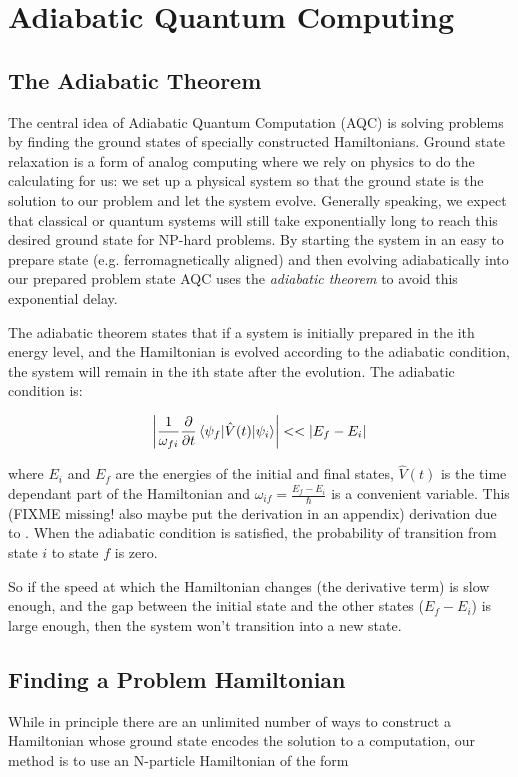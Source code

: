 \chapter{Adiabatic Quantum Computing}
\label{chap:aqc}

\section{The Adiabatic Theorem}

The central idea of Adiabatic Quantum Computation (AQC) is solving problems by finding the ground states of specially constructed Hamiltonians.  Ground state relaxation is a form of analog computing where we rely on physics to do the calculating for us: we set up a physical system so that the ground state is the solution to our problem and let the system evolve.  Generally speaking, we expect that classical or quantum systems will still take exponentially long to reach this desired ground state for NP-hard problems.\cite{aaronson}
By starting the system in an easy to prepare state (e.g. ferromagnetically aligned) and then evolving adiabatically into our prepared problem state AQC uses the \emph{adiabatic theorem} to avoid this exponential delay.

The adiabatic theorem states that if a system is initially prepared in the ith energy level, and the Hamiltonian is evolved according to the adiabatic condition, the system will remain in the ith state after the evolution.  The adiabatic condition is:

\begin{displaymath}
	\left | \frac{1}{\omega_{fi}}\frac{\partial}{\partial t} \mathinner{\langle{\psi_f | \hat{V}(t) | \psi_i}\rangle} \right | << |E_f - E_i|
\end{displaymath}

where $E_i$ and $E_f$ are the energies of the initial and final states, $\hat{V}(t)$ is the time dependant part of the Hamiltonian and $\omega_{if} = \frac{E_f - E_i}{\hbar}$ is a convenient variable.  This (FIXME missing! also maybe put the derivation in an appendix) derivation due to \cite{zettili}.  When the adiabatic condition is satisfied, the probability of transition from state $i$ to state $f$ is zero.

So if the speed at which the Hamiltonian changes (the derivative term) is slow enough, and the gap between the initial state and the other states ($E_f - E_i$) is large enough, then the system won't transition into a new state.  

\section{Finding a Problem Hamiltonian}
\label{sec:prob_ham}
While in principle there are an unlimited number of ways to construct a Hamiltonian whose ground state encodes the solution to a computation, our method is to use an N-particle Hamiltonian of the form

